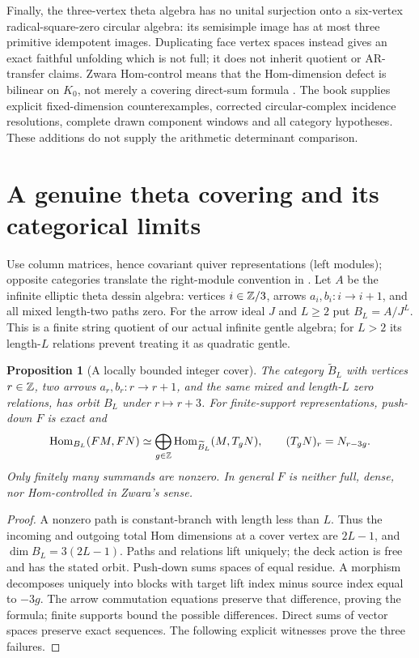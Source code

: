 \documentclass[11pt]{article}
\newtheorem{proposition}[theorem]{Proposition}
\theoremstyle{definition}\newtheorem{definition}[theorem]{Definition}
\theoremstyle{remark}\newtheorem{remark}[theorem]{Remark}
\begin{document}
Finally, the three-vertex theta algebra has no unital surjection onto a six-vertex radical-square-zero circular algebra: its semisimple image has at most three primitive idempotent images. Duplicating face vertex spaces instead gives an exact faithful unfolding which is not full; it does not inherit quotient or AR-transfer claims. Zwara Hom-control means that the Hom-dimension defect is bilinear on $K_0$, not merely a covering direct-sum formula \cite{ZwaraCorrected,RiedtmannZwaraCorrected}. The book supplies explicit fixed-dimension counterexamples, corrected circular-complex incidence resolutions, complete drawn component windows and all category hypotheses. These additions do not supply the arithmetic determinant comparison.


\section{A genuine theta covering and its categorical limits}
\label{cover:section}
Use column matrices, hence covariant quiver representations (left modules);
opposite categories translate the right-module convention in
\cite{CoveringLecture2026}. Let $A$ be the infinite elliptic theta dessin
algebra: vertices $i\in\mathbb Z/3$, arrows $a_i,b_i:i\to i+1$, and all mixed
length-two paths zero. For the arrow ideal $J$ and $L\geq2$ put $B_L=A/J^L$.
This is a finite string quotient of our actual infinite gentle algebra;
for $L>2$ its length-$L$ relations prevent treating it as quadratic gentle.

\begin{proposition}[A locally bounded integer cover]\label{cover:hom}
The category $\widetilde B_L$ with vertices $r\in\mathbb Z$, two arrows
$a_r,b_r:r\to r+1$, and the same mixed and length-$L$ zero relations,
has orbit $B_L$ under $r\mapsto r+3$. For finite-support representations,
push-down $F$ is exact and
\[
 \operatorname{Hom}_{B_L}(FM,FN)
 \simeq\bigoplus_{g\in\mathbb Z}
       \operatorname{Hom}_{\widetilde B_L}(M,T_gN),\qquad
 (T_gN)_r=N_{r-3g}.
\]
Only finitely many summands are nonzero. In general $F$ is neither full,
dense, nor Hom-controlled in Zwara's sense.
\end{proposition}
\begin{proof}
A nonzero path is constant-branch with length less than $L$.
Thus the incoming and outgoing total Hom dimensions at a cover vertex are
$2L-1$, and $\dim B_L=3(2L-1)$. Paths and relations lift uniquely; the
deck action is free and has the stated orbit. Push-down sums spaces of equal
residue. A morphism decomposes uniquely into blocks with target lift index
minus source index equal to $-3g$. The arrow commutation equations preserve
that difference, proving the formula; finite supports bound the possible
differences. Direct sums of vector spaces preserve exact sequences.
The following explicit witnesses prove the three failures.
\end{proof}
\end{document}
